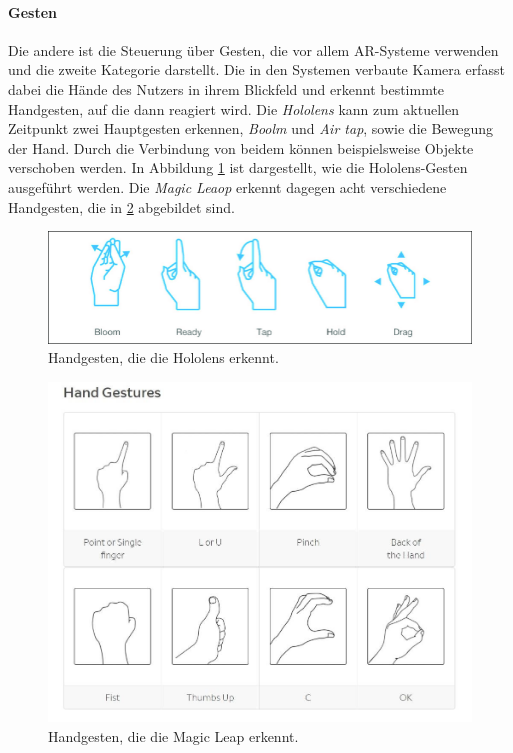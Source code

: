 \paragraph{Gesten}
Die andere ist die Steuerung über Gesten, die vor allem AR-Systeme verwenden und die zweite Kategorie darstellt.
Die in den Systemen verbaute Kamera erfasst dabei die Hände des Nutzers in ihrem Blickfeld und erkennt bestimmte Handgesten, auf die dann reagiert wird. 
Die \textit{Hololens} kann zum aktuellen Zeitpunkt zwei Hauptgesten erkennen, \textit{Boolm} und \textit{Air tap}, sowie die Bewegung der Hand. Durch die Verbindung von beidem können beispielsweise Objekte verschoben werden. In Abbildung \ref{img:hololensGestures} ist dargestellt, wie die Hololens-Gesten ausgeführt werden. 
Die \textit{Magic Leaop} erkennt dagegen acht verschiedene Handgesten, die in \ref{img:magicGestures} abgebildet sind. 


\begin{figure}
	\centering
	\includegraphics[width=0.7\linewidth]{images/hololensGestures.png}
	\caption{Handgesten, die die Hololens erkennt.}
	\label{img:hololensGestures}
\end{figure}

\begin{figure}
	\centering
	\includegraphics[width=0.7\linewidth]{images/magicleapGestures.jpg}
	\caption{Handgesten, die die Magic Leap erkennt.}
	\label{img:magicGestures}
\end{figure}

